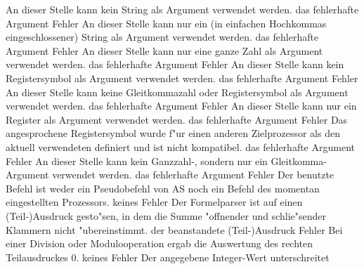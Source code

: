\documentclass[12pt,a4paper,twoside]{report}
\begin{document}
\begin{description}
               {An dieser Stelle kann kein String als Argument
                verwendet werden.}
               {das fehlerhafte Argument}
               {Fehler}
               {An dieser Stelle kann nur ein (in einfachen Hochkommas
                eingeschlossener) String als Argument verwendet werden.}
               {das fehlerhafte Argument}
               {Fehler}
               {An dieser Stelle kann nur eine ganze Zahl als Argument
                verwendet werden.}
               {das fehlerhafte Argument}
               {Fehler}
               {An dieser Stelle kann kein Registersymbol als Argument verwendet werden.}
               {das fehlerhafte Argument}
               {Fehler}
               {An dieser Stelle kann keine Gleitkommazahl oder Registersymbol als Argument verwendet werden.}
               {das fehlerhafte Argument}
               {Fehler}
               {An dieser Stelle kann nur ein Register als Argument verwendet werden.}
               {das fehlerhafte Argument}
               {Fehler}
               {Das angesprochene Registersymbol wurde f"ur einen anderen Zielprozessor
                als den aktuell verwendeten definiert und ist nicht kompatibel.}
               {das fehlerhafte Argument}
               {Fehler}
               {An dieser Stelle kann kein Ganzzahl-, sondern nur ein Gleitkomma-
                Argument verwendet werden.}
               {das fehlerhafte Argument}
               {Fehler}
               {Der benutzte Befehl ist weder ein Pseudobefehl
                von AS noch ein Befehl des momentan eingestellten
                Prozessors.}
               {keines}
               {Fehler}
               {Der Formelparser ist auf einen (Teil-)Ausdruck
                gesto"sen, in dem die Summe "offnender und schlie"sender
                Klammern nicht "ubereinstimmt.}
               {der beanstandete (Teil-)Ausdruck}
               {Fehler}
               {Bei einer Division oder Modulooperation ergab
                die Auswertung des rechten Teilausdruckes 0.}
               {keines}
               {Fehler}
               {Der angegebene Integer-Wert unterschreitet
}
\end{description}
\end{document}
